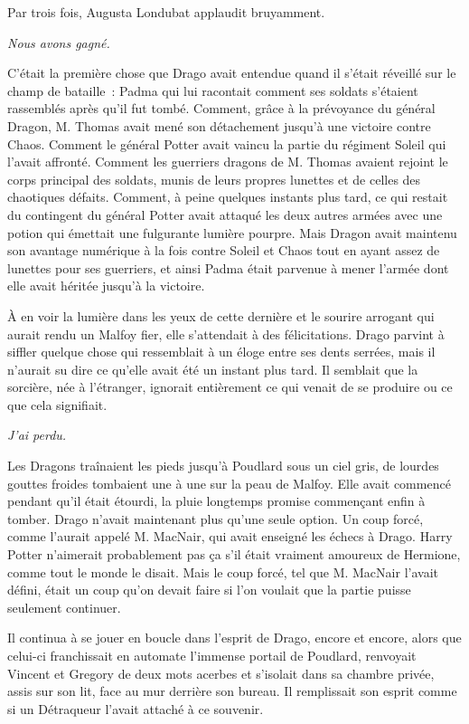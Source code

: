 Par trois fois, Augusta Londubat applaudit bruyamment.

\later

\emph{Nous avons gagné.}

C'était la première chose que Drago avait entendue quand il s'était réveillé sur le champ de bataille~: Padma qui lui racontait comment ses soldats s'étaient rassemblés après qu'il fut tombé. Comment, grâce à la prévoyance du général Dragon, M. Thomas avait mené son détachement jusqu'à une victoire contre Chaos. Comment le général Potter avait vaincu la partie du régiment Soleil qui l'avait affronté. Comment les guerriers dragons de M. Thomas avaient rejoint le corps principal des soldats, munis de leurs propres lunettes et de celles des chaotiques défaits. Comment, à peine quelques instants plus tard, ce qui restait du contingent du général Potter avait attaqué les deux autres armées avec une potion qui émettait une fulgurante lumière pourpre. Mais Dragon avait maintenu son avantage numérique à la fois contre Soleil et Chaos tout en ayant assez de lunettes pour ses guerriers, et ainsi Padma était parvenue à mener l'armée dont elle avait héritée jusqu'à la victoire.

À en voir la lumière dans les yeux de cette dernière et le sourire arrogant qui aurait rendu un Malfoy fier, elle s'attendait à des félicitations. Drago parvint à siffler quelque chose qui ressemblait à un éloge entre ses dents serrées, mais il n'aurait su dire ce qu'elle avait été un instant plus tard. Il semblait que la sorcière, née à l'étranger, ignorait entièrement ce qui venait de se produire ou ce que cela signifiait.

\emph{J'ai perdu.}

Les Dragons traînaient les pieds jusqu'à Poudlard sous un ciel gris, de lourdes gouttes froides tombaient une à une sur la peau de Malfoy. Elle avait commencé pendant qu'il était étourdi, la pluie longtemps promise commençant enfin à tomber. Drago n'avait maintenant plus qu'une seule option. Un coup forcé, comme l'aurait appelé M. MacNair, qui avait enseigné les échecs à Drago. Harry Potter n'aimerait probablement pas ça s'il était vraiment amoureux de Hermione, comme tout le monde le disait. Mais le coup forcé, tel que M. MacNair l'avait défini, était un coup qu'on devait faire si l'on voulait que la partie puisse seulement continuer.

Il continua à se jouer en boucle dans l'esprit de Drago, encore et encore, alors que celui-ci franchissait en automate l'immense portail de Poudlard, renvoyait Vincent et Gregory de deux mots acerbes et s'isolait dans sa chambre privée, assis sur son lit, face au mur derrière son bureau. Il remplissait son esprit comme si un Détraqueur l'avait attaché à ce souvenir.

